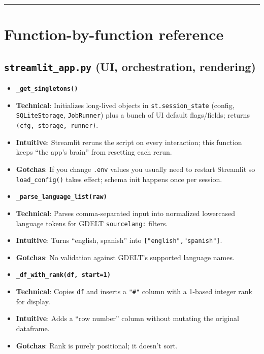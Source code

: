 \documentclass[11pt]{article}
\begin{document}
\vspace{0.5em}\noindent\rule{\textwidth}{0.4pt}\vspace{0.5em}


\section{Function-by-function reference}


\subsection{\texttt{streamlit\_app.py} (UI, orchestration, rendering)}


\begin{itemize}[leftmargin=*,nosep]
\item \textbf{\texttt{\_get\_singletons()}}
\item \textbf{Technical}: Initializes long-lived objects in \texttt{st.session\_state} (config, \texttt{SQLiteStorage}, \texttt{JobRunner}) plus a bunch of UI default flags/fields; returns \texttt{(cfg, storage, runner)}.
\item \textbf{Intuitive}: Streamlit reruns the script on every interaction; this function keeps “the app’s brain” from resetting each rerun.
\item \textbf{Gotchas}: If you change \texttt{.env} values you usually need to restart Streamlit so \texttt{load\_config()} takes effect; schema init happens once per session.
\end{itemize}


\begin{itemize}[leftmargin=*,nosep]
\item \textbf{\texttt{\_parse\_language\_list(raw)}}
\item \textbf{Technical}: Parses comma-separated input into normalized lowercased language tokens for GDELT \texttt{sourcelang:} filters.
\item \textbf{Intuitive}: Turns “english, spanish” into \texttt{["english","spanish"]}.
\item \textbf{Gotchas}: No validation against GDELT’s supported language names.
\end{itemize}


\begin{itemize}[leftmargin=*,nosep]
\item \textbf{\texttt{\_df\_with\_rank(df, start=1)}}
\item \textbf{Technical}: Copies \texttt{df} and inserts a \texttt{"\#"} column with a 1-based integer rank for display.
\item \textbf{Intuitive}: Adds a “row number” column without mutating the original dataframe.
\item \textbf{Gotchas}: Rank is purely positional; it doesn’t sort.
\end{itemize}
\end{document}
